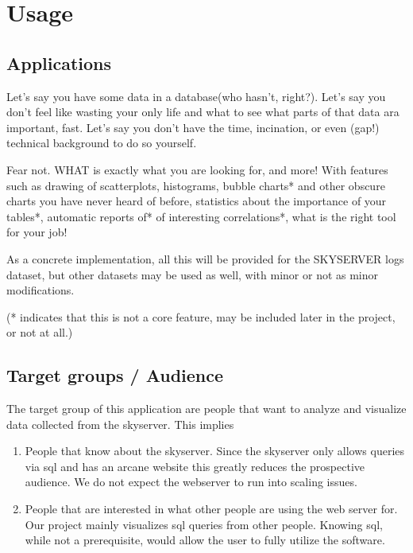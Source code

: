 \section{Usage}

\subsection{Applications}
Let's say you have some data in a database(who hasn't, right?).
Let's say you don't feel like wasting your only life and what to see what parts of that data ara important, fast.
Let's say you don't have the time, incination, or even (gap!) technical background to do so yourself.

Fear not. WHAT is exactly what you are looking for, and more!
With features such as drawing of scatterplots, histograms, bubble charts* 
and other obscure charts you have never heard of before, statistics about the importance of your tables*,
automatic reports of* of interesting correlations*, what is the right tool for your job!

As a concrete implementation, all this will be provided for the SKYSERVER logs dataset, but other datasets may be
used as well, with minor or not as minor modifications.

(* indicates that this is not a core feature, may be included later in the project, or not at all.)

\subsection{Target groups / Audience}

The target group of this application are people that want to analyze 
and visualize data collected from the skyserver. This implies

\begin{enumerate}
   \item People that know about the skyserver. Since the skyserver only 
   allows queries via sql and has an arcane website this greatly 
   reduces the prospective audience. We do not expect the webserver 
   to run into scaling issues.
  
  \item People that are interested in what other people are 
  using the web server for. Our project mainly visualizes sql queries
   from other people. Knowing sql, while not a prerequisite, 
   would allow the user to fully utilize the software.
  
\end{enumerate}

